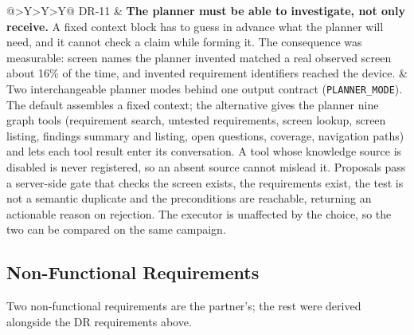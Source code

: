 \begin{xltabular}{\textwidth}{@{}>{\hsize}Y>{\hsize}Y>{\hsize}Y@{}}
  \addlinespace
  DR-11 & \textbf{The planner must be able to investigate, not only receive.} A fixed context block has to guess in advance what the planner will need, and it cannot check a claim while forming it. The consequence was measurable: screen names the planner invented matched a real observed screen about 16\% of the time, and invented requirement identifiers reached the device. &
  Two interchangeable planner modes behind one output contract (\texttt{PLANNER\_MODE}). The default assembles a fixed context; the alternative gives the planner nine graph tools (requirement search, untested requirements, screen lookup, screen listing, findings summary and listing, open questions, coverage, navigation paths) and lets each tool result enter its conversation. A tool whose knowledge source is disabled is never registered, so an absent source cannot mislead it. Proposals pass a server-side gate that checks the screen exists, the requirements exist, the test is not a semantic duplicate and the preconditions are reachable, returning an actionable reason on rejection. The executor is unaffected by the choice, so the two can be compared on the same campaign. \\
\end{xltabular}
\endgroup

\subsection{Non-Functional Requirements}
\label{subsec:nfr}

Two non-functional requirements are the partner's; the rest were derived
alongside the DR requirements above.

